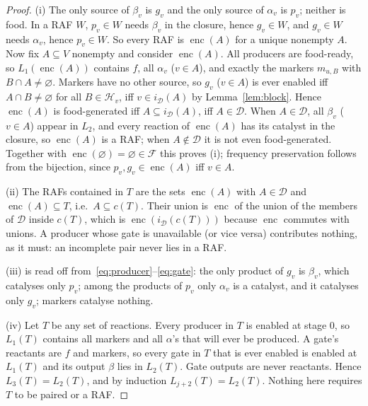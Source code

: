 \documentclass[11pt,a4paper]{article}
\theoremstyle{plain}
\theoremstyle{definition}
\theoremstyle{remark}
\newcommand{\FF}{\mathcal F}
\newcommand{\DD}{\mathcal D}
\newcommand{\HH}{\mathcal H}
\newcommand{\enc}{\operatorname{enc}}
\begin{document}
\begin{proof}
(i) The only source of $\beta_v$ is $g_v$ and the only source of $\alpha_v$ is $p_v$;
neither is food. In a RAF $W$, $p_v\in W$ needs $\beta_v$ in the closure, hence $g_v\in W$,
and $g_v\in W$ needs $\alpha_v$, hence $p_v\in W$. So every RAF is $\enc(A)$ for a unique
nonempty $A$. Now fix $A\subseteq V$ nonempty and consider $\enc(A)$. All producers are
food-ready, so $L_1(\enc(A))$ contains $f$, all $\alpha_v$ ($v\in A$), and exactly the
markers $m_{u,B}$ with $B\cap A\neq\varnothing$. Markers have no other source, so $g_v$
($v\in A$) is ever enabled iff $A\cap B\neq\varnothing$ for all $B\in\HH_v$, iff
$v\in i_\DD(A)$ by Lemma~\ref{lem:block}. Hence $\enc(A)$ is food-generated iff
$A\subseteq i_\DD(A)$, iff $A\in\DD$. When $A\in\DD$, all $\beta_v$ ($v\in A$) appear in
$L_2$, and every reaction of $\enc(A)$ has its catalyst in the closure, so $\enc(A)$ is a
RAF; when $A\notin\DD$ it is not even food-generated. Together with
$\enc(\varnothing)=\varnothing\in\FF$ this proves (i); frequency preservation follows from
the bijection, since $p_v,g_v\in\enc(A)$ iff $v\in A$.

(ii) The RAFs contained in $T$ are the sets $\enc(A)$ with $A\in\DD$ and $\enc(A)\subseteq T$,
i.e.\ $A\subseteq c(T)$. Their union is $\enc$ of the union of the members of $\DD$ inside
$c(T)$, which is $\enc(i_\DD(c(T)))$ because $\enc$ commutes with unions. A producer whose
gate is unavailable (or vice versa) contributes nothing, as it must: an incomplete pair
never lies in a RAF.

(iii) is read off from~\eqref{eq:producer}--\eqref{eq:gate}: the only product of $g_v$ is
$\beta_v$, which catalyses only $p_v$; among the products of $p_v$ only $\alpha_v$ is a
catalyst, and it catalyses only $g_v$; markers catalyse nothing.

(iv) Let $T$ be any set of reactions. Every producer in $T$ is enabled at stage $0$, so
$L_1(T)$ contains all markers and all $\alpha$'s that will ever be produced. A gate's
reactants are $f$ and markers, so every gate in $T$ that is ever enabled is enabled at
$L_1(T)$ and its output $\beta$ lies in $L_2(T)$. Gate outputs are never reactants. Hence
$L_3(T)=L_2(T)$, and by induction $L_{j+2}(T)=L_2(T)$. Nothing here requires $T$ to be
paired or a RAF.
\end{proof}
\end{document}
